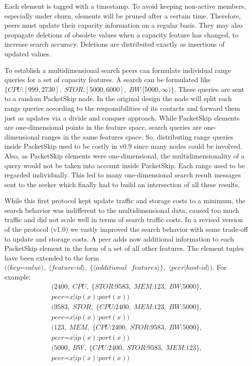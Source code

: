Each element is tagged with a timestamp. To avoid keeping non-active members, especially under churn, elements will be pruned after a certain time. Therefore, peers must update their capacity information on a regular basis. They may also propagate deletions of obsolete values when a capacity feature has changed, to increase search accuracy. Deletions are distributed exactly as insertions of updated values.

To establish a multidimensional search peers can formulate individual range queries for a set of capacity features. 
A search can be formulated like 
$\{CPU\text{:}[999,2730],\;STOR\text{:}[5000,6000],\;BW\text{:}[5000,\infty)\}$.
These queries are sent to a random PacketSkip node. In the original design the node will split each range queries according to the responsibilities of its contacts and forward them just as updates via a divide and conquer approach. While PacketSkip elements are one-dimensional points in the feature space, search queries are one-dimensional ranges in the same features space. So, distributing range queries inside PacketSkip used to be costly in v0.9 since many nodes could be involved. Also, as PacketSkip elements were one-dimensional, the multidimensionality of a query would not be taken into account inside PacketSkip. Each range used to be regarded individually. This led to many one-dimensional search result messages sent to the seeker which finally had to build an intersection of all these results.

While this first protocol kept update traffic and storage costs to a minimum, the search behavior was indifferent to the multidimensional data, caused too much traffic and did not scale well in terms of search traffic costs. In a revised version of the protocol (v1.0) we vastly improved the search behavior with some trade-off to update and storage costs. A peer adds now additional information to each PacketSkip element in the form of a set of all other features. The element tuples have been extended to the form 
$(\langle key\text{=}value\rangle,\;\langle feature\text{-}id\rangle,\;\{\langle additional\text{ }features\rangle \},$ $\langle peer | host\text{-}id\rangle )$.
For example:
\begin{equation*}
\begin{split}
(2400,\;CPU,  \;\{STOR\text{:}9583,  \;MEM \text{:}123,  \;BW\text {:}5000\}, \\ peer\text{=}x | ip(x)\text{:}port(x)) \\
(9583,\;STOR, \;\{CPU \text{:}2400,  \;MEM \text{:}123,  \;BW\text {:}5000\}, \\ peer\text{=}x | ip(x)\text{:}port(x)) \\
(123, \;MEM,  \;\{CPU \text{:}2400,  \;STOR\text{:}9583, \;BW\text {:}5000\}, \\ peer\text{=}x | ip(x)\text{:}port(x)) \\
(5000,\;BW,   \;\{CPU \text{:}2400,  \;STOR\text{:}9583, \;MEM\text{:}123 \}, \\ peer\text{=}x | ip(x)\text{:}port(x))
\end{split}
\end{equation*}

